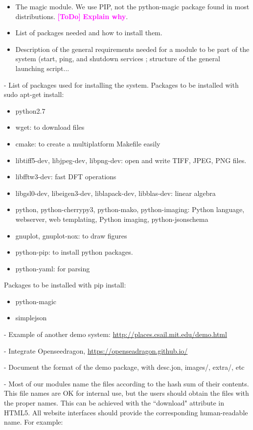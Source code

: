 \documentclass[a4paper,12pt]{article}
\newcommand{\ToDo}[1]{\textcolor{magenta}{\textbf{[ToDo]} \textbf{#1}}}
\begin{document}
\begin{itemize}
  \item The magic module. We use PIP, not the python-magic package found in most distributions. \ToDo{Explain why}.
  \item List of packages needed and how to install them.
  \item Description of the general requirements needed for a module to be part of the system (start, ping, and shutdown services ; structure of the general launching script...
\end{itemize}

- List of packages used for installing the system. Packages to be installed with sudo apt-get install:

\begin{itemize}
\item python2.7
\item wget: to download files
\item cmake: to create a multiplatform Makefile easily
\item libtiff5-dev, libjpeg-dev, libpng-dev: open and write TIFF, JPEG, PNG files.
\item libfftw3-dev: fast DFT operations
\item libgsl0-dev, libeigen3-dev, liblapack-dev, libblas-dev: linear algebra
\item python, python-cherrypy3, python-mako, python-imaging: Python language, webserver, web templating, 
      Python imaging, python-jsonschema
\item gnuplot, gnuplot-nox: to draw figures
\item python-pip: to install python packages. 
\item python-yaml: for parsing
\end{itemize}
Packages to be installed with pip install:
\begin{itemize}
\item python-magic
\item simplejson
\end{itemize}

- Example of another demo system: \url{http://places.csail.mit.edu/demo.html}

- Integrate Openseedragon, \url{https://openseadragon.github.io/}

- Document the format of the demo package, with desc.jon, images/, extra/, etc

- Most of our modules name the files according to the hash sum of their contents. This file names are OK for internal use, but the users should obtain the files with the proper names. This can be achieved with the ``download" attribute in HTML5. All website interfaces should provide the corresponding human-readable name. For example:
\end{document}
